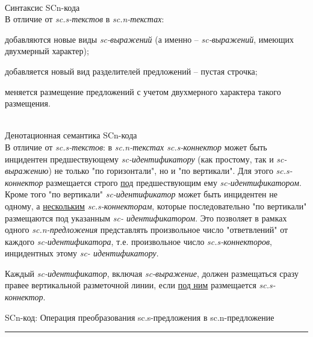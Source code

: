\begin{frame}{\\Синтаксис SCn-кода}
	\topline
	\justifying
	\vspace*{\fill}\\
	В отличие от \textit{sc.s-текстов} в \textit{sc.n-текстах}:
	\begin{textitemize}
		\item добавляются новые виды \textit{sc-выражений} (а именно -- \textit{sc-выражений}, имеющих двухмерный характер);
		\item добавляется новый вид разделителей предложений -- пустая строчка;
		\item меняется размещение предложений с учетом двухмерного характера такого размещения.
	\end{textitemize}
\end{frame}

\begin{frame}{\\Денотационная семантика SCn-кода}
	\topline
	\justifying
	\vspace*{\fill}\\
	В отличие от \textit{sc.s-текстов}: в \textit{sc.n-текстах sc.s-коннектор} может быть инцидентен предшествующему \textit{sc-идентификатору} (как простому, так и \textit{sc-выражению}) не только "по горизонтали"{}, но и "по вертикали"{}. Для этого \textit{sc.s-коннектор} размещается строго \underline{под} предшествующим ему \textit{sc-идентификатором}.\\ Кроме того "по вертикали"{} \textit{sc-идентификатор} может быть инцидентен не одному, а \underline{нескольким} \textit{sc.s-коннекторам}, которые последовательно "по вертикали"{} размещаются под указанным \textit{sc- идентификатором}. Это позволяет в рамках одного \textit{sc.n-предложения} представлять произвольное число "ответвлений"{} от каждого \textit{sc-идентификатора}, т.е. произвольное число \textit{sc.s-коннекторов}, инцидентных этому \textit{sc- идентификатору}.
	
	Каждый \textit{sc-идентификатор}, включая \textit{sc-выражение}, должен размещаться сразу правее вертикальной разметочной линии, если \underline{под ним} размещается \textit{sc.s-коннектор}.
\end{frame}

\begin{frame}{SCn-код: Операция преобразования sc.s-предложения в sc.n-предложение}
	\topline
	\justifying
	\vspace*{\fill}\\
	\begin{SCn}
		
		\noindent\rule{12cm}{1.5pt}		
		
		\begin{scnindent}
		\end{scnindent}
	
	\end{SCn}
\end{frame}

